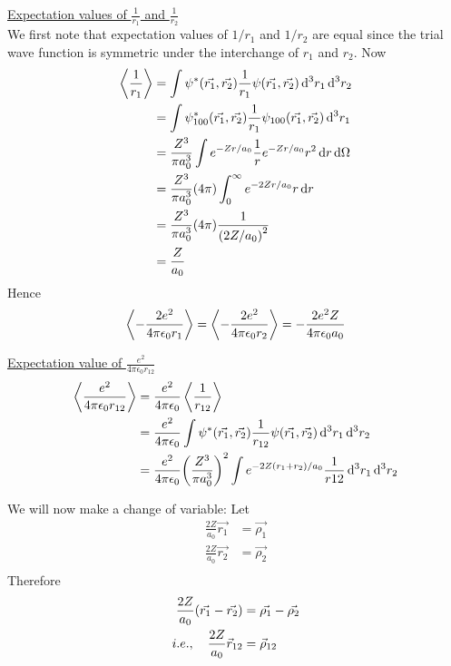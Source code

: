 	\underline{Expectation values of $\frac{1}{r_1}$ and $\frac{1}{r_2}$}\\
	We first note that expectation values of $1/r_1$ and $1/r_2$ are equal since the trial wave function is symmetric under the interchange of $r_1$ and $r_2$. Now
	\begin{align*}
		\expval{\frac{1}{r_1}} 
		&= \int \psi^*\qty(\vec{r_1}, \vec{r_2}) \frac{1}{r_1} \psi\qty(\vec{r_1}, \vec{r_2}) \dd[3]{r_1} \dd[3]{r_2} \\
		&= \int \psi^*_{1 0 0}\qty(\vec{r_1}, \vec{r_2}) \frac{1}{r_1} \psi_{1 0 0}\qty(\vec{r_1}, \vec{r_2}) \dd[3]{r_1} \\
		&= \frac{Z^3}{\pi a_0^3} \int e^{-Z r/a_0} \frac{1}{r} e^{-Z r/a_0} r^2 \dd{r} \dd{\Omega}\\
		&= \frac{Z^3}{\pi a_0^3} \qty(4\pi) \int_{0}^{\infty} e^{-2Z r/a_0} r \dd{r} \\
		&= \frac{Z^3}{\pi a_0^3} \qty(4\pi) \frac{1}{\qty(2 Z / a_0)^2}\\
		&= \frac{Z}{a_0}
	\end{align*}
	Hence
	\begin{align}
		\expval{-\frac{2 e^2}{4\pi \epsilon_0 r_1}} = \expval{-\frac{2 e^2}{4\pi \epsilon_0 r_2}} = - \frac{2 e^2 Z}{4\pi \epsilon_0 a_0}
		\label{chapter21.eqn3-example-helium}
	\end{align}
	
	\underline{Expectation value of $\frac{e^2}{4\pi \epsilon_0 r_{1 2}}$}\\
	\begin{align}
		\expval{\frac{e^2}{4\pi \epsilon_0 r_{1 2}}} &= \frac{e^2}{4\pi \epsilon_0} \expval{\frac{1}{r_{1 2}}} \\
		&= \frac{e^2}{4\pi \epsilon_0} \int \psi^*\qty(\vec{r_1}, \vec{r_2}) \frac{1}{r_{1 2}} \psi\qty(\vec{r_1}, \vec{r_2}) \dd[3]{r_1} \dd[3]{r_2} \\
		&= \frac{e^2}{4\pi \epsilon_0} \qty(\frac{Z^3}{\pi a_0^3})^{2} \int e^{-2 Z \qty(r_1 + r_2)/a_0} \frac{1}{r{1 2}} \dd[3]{r_1} \dd[3]{r_2}
	\end{align}
	
	We will now make a change of variable:
	Let
	\begin{align*}
		\frac{2 Z}{a_0} \vec{r_1} &= \vec{\rho_1} \\
		\frac{2 Z}{a_0} \vec{r_2} &= \vec{\rho_2} \\
	\end{align*}
	Therefore
	\begin{align*}
		\frac{2 Z}{a_0} \qty(\vec{r_1} - \vec{r_2}) &= \vec{\rho_1}  -  \vec{\rho_2} \\
		i.e., \quad \frac{2 Z}{a_0} \vec{r}_{12} &= \vec{\rho}_{12}
	\end{align*}

